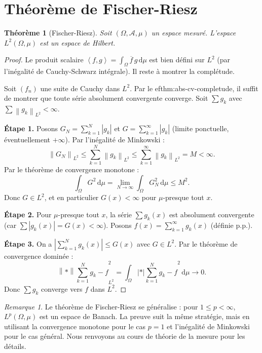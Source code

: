 \documentclass[a4paper,12pt]{book}
\newcommand{\dd}{\mathrm{d}}
\newcommand{\norm}[1]{\left\| #1 \right\|}
\newcommand{\abs}[1]{\left| #1 \right|}
\newcommand{\inner}[2]{\left\langle #1, #2 \right\rangle}
\theoremstyle{definition}
\theoremstyle{plain}
\newtheorem{theoreme}[definition]{Théorème}
\theoremstyle{remark}
\newtheorem{remarque}[definition]{Remarque}
\begin{document}
\section{Théorème de Fischer-Riesz}

\begin{theoreme}[Fischer-Riesz]\label{thm:fischer-riesz}
Soit $(\Omega, \mathcal{A}, \mu)$ un espace mesuré. L'espace $L^2(\Omega, \mu)$ est un espace de Hilbert.
\end{theoreme}

\begin{proof}
Le produit scalaire $\inner{f}{g} = \int_\Omega \overline{f}\, g\,\dd\mu$ est bien défini sur $L^2$ (par l'inégalité de Cauchy-Schwarz intégrale). Il reste à montrer la complétude.

Soit $(f_n)$ une suite de Cauchy dans $L^2$. Par le 
ef{thm:abs-cv-completude}, il suffit de montrer que toute série absolument convergente converge. Soit $\sum g_k$ avec $\sum \norm{g_k}_{L^2} < \infty$.

\textbf{Étape 1.} Posons $G_N = \sum_{k=1}^N \abs{g_k}$ et $G = \sum_{k=1}^\infty \abs{g_k}$ (limite ponctuelle, éventuellement $+\infty$). Par l'inégalité de Minkowski :
\[
    \norm{G_N}_{L^2} \leq \sum_{k=1}^N \norm{g_k}_{L^2} \leq \sum_{k=1}^\infty \norm{g_k}_{L^2} = M < \infty.
\]
Par le théorème de convergence monotone :
\[
    \int_\Omega G^2 \,\dd\mu = \lim_{N\to\infty}\int_\Omega G_N^2\,\dd\mu \leq M^2.
\]
Donc $G \in L^2$, et en particulier $G(x) < \infty$ pour $\mu$-presque tout $x$.

\textbf{Étape 2.} Pour $\mu$-presque tout $x$, la série $\sum g_k(x)$ est absolument convergente (car $\sum \abs{g_k(x)} = G(x) < \infty$). Posons $f(x) = \sum_{k=1}^\infty g_k(x)$ (définie p.p.).

\textbf{Étape 3.} On a $\abs{\sum_{k=1}^N g_k(x)} \leq G(x)$ avec $G \in L^2$. Par le théorème de convergence dominée :
\[
    \norm*{\sum_{k=1}^N g_k - f}_{L^2}^2 = \int_\Omega \abs*{\sum_{k=1}^N g_k - f}^2 \,\dd\mu \to 0.
\]
Donc $\sum g_k$ converge vers $f$ dans $L^2$.
\end{proof}

\begin{remarque}\label{rem:fischer-riesz-general}
Le théorème de Fischer-Riesz se généralise : pour $1 \leq p < \infty$, $L^p(\Omega, \mu)$ est un espace de Banach. La preuve suit la même stratégie, mais en utilisant la convergence monotone pour le cas $p = 1$ et l'inégalité de Minkowski pour le cas général. Nous renvoyons au cours de théorie de la mesure pour les détails.
\end{remarque}
\end{document}
